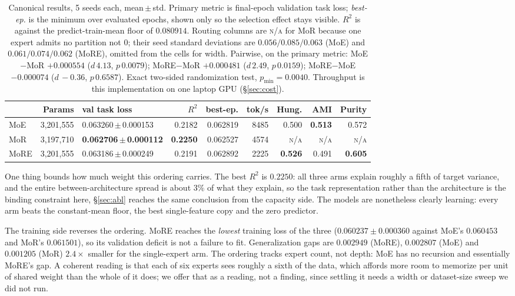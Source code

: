 \documentclass{article}
\begin{document}
\begin{table}[t]
\centering
\footnotesize
\caption{Canonical results, 5 seeds each, mean\,$\pm$\,std. Primary metric is
final-epoch validation task loss; \emph{best-ep.} is the minimum over
evaluated epochs, shown only so the selection effect stays visible. $R^2$ is
against the predict-train-mean floor of $0.080914$. Routing columns are
\textsc{n/a} for MoR because one expert admits no partition  not $0$; their
seed standard deviations are $0.056/0.085/0.063$ (MoE) and $0.061/0.074/0.062$
(MoRE), omitted from the cells for width.
Pairwise, on the primary metric: MoE${-}$MoR $+0.000554$ ($d\,4.13$,
$p\,0.0079$); MoRE${-}$MoR $+0.000481$ ($d\,2.49$, $p\,0.0159$);
MoRE${-}$MoE $-0.000074$ ($d\,{-}0.36$, $p\,0.6587$). Exact two-sided
randomization test, $p_{\min} = 0.0040$. Throughput is this implementation on
one laptop GPU (\S\ref{sec:cost}).}
\label{tab:main}
\vspace{2pt}
\begin{tabular}{lrlrrrrrr}
\toprule
& Params & val task loss & $R^2$ & best-ep. & tok/s & Hung. & AMI & Purity \\
\midrule
MoE  & 3{,}201{,}555 & 0.063260\,$\pm$\,0.000153 & 0.2182 & 0.062819 & 8485 & 0.500 & \textbf{0.513} & 0.572 \\
MoR  & 3{,}197{,}710 & \textbf{0.062706\,$\pm$\,0.000112} & \textbf{0.2250} & 0.062527 & 4574 & \textsc{n/a} & \textsc{n/a} & \textsc{n/a} \\
MoRE & 3{,}201{,}555 & 0.063186\,$\pm$\,0.000249 & 0.2191 & 0.062892 & 2225 & \textbf{0.526} & 0.491 & \textbf{0.605} \\
\bottomrule
\end{tabular}
\end{table}

One thing bounds how much weight this ordering carries. The best $R^2$ is
$0.2250$: all three arms explain roughly a fifth of target variance, and the
entire between-architecture spread is about $3\%$ of what they explain, so the
task representation rather than the architecture is the binding constraint here, 
\S\ref{sec:abl} reaches the same conclusion from the capacity side. The
models are nonetheless clearly learning: every arm beats the constant-mean
floor, the best single-feature copy and the zero predictor.

The training side reverses the ordering. MoRE reaches the \emph{lowest} training
loss of the three ($0.060237 \pm 0.000360$ against MoE's $0.060453$ and MoR's
$0.061501$), so its validation deficit is not a failure to fit. Generalization
gaps are $0.002949$ (MoRE), $0.002807$ (MoE) and $0.001205$ (MoR) 
$2.4\times$ smaller for the single-expert arm. The ordering tracks expert count,
not depth: MoE has no recursion and essentially MoRE's gap. A coherent reading is
that each of six experts sees roughly a sixth of the data, which affords more
room to memorize per unit of shared weight than the whole of it does; we offer
that as a reading, not a finding, since settling it needs a width or
dataset-size sweep we did not run.
\end{document}
